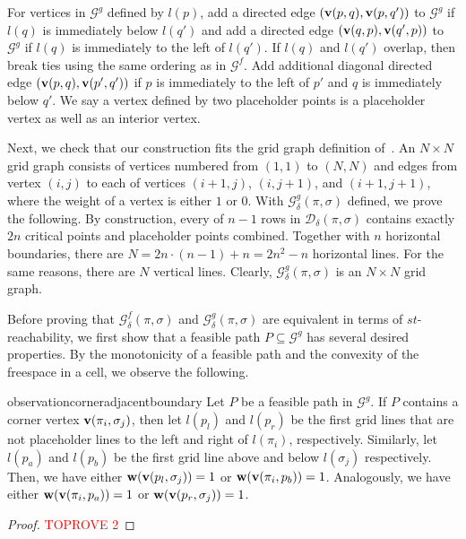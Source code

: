 \documentclass[thm-restate]{lipics-v2021}
\theoremstyle{remark}
\newcommand{\weight}[1]{\normalfont \textbf{w}(#1)}
\newcommand{\graph}[0]{\mathcal{G}}
\newcommand{\fd}[2]{\mathcal{D}_{#2}(#1)}
\newcommand{\vertex}[1]{\normalfont \textbf{v}(#1)}
\newcommand{\fsgraph}[0]{\graph^{f}}
\newcommand{\ggraph}[0]{\graph^g}
\begin{document}
For vertices in $\ggraph$ defined by $l(p)$, add a directed edge $(\vertex{p, q}, \vertex{p, q'})$ to $\ggraph$ if $l(q)$ is immediately below $l(q')$ and add a directed edge $(\vertex{q, p}, \vertex{q', p})$ to $\ggraph$ if $l(q)$ is immediately to the left of $l(q')$. If $l(q)$ and $l(q')$ overlap, then break ties using the same ordering as in $\fsgraph$. Add additional diagonal directed edge $(\vertex{p, q}, \vertex{p', q'})$ if $p$ is immediately to the left of $p'$ and $q$ is immediately below $q'$. We say a vertex defined by two placeholder points is a placeholder vertex as well as an interior vertex. 

Next, we check that our construction fits the grid graph definition of~\cite{bringmannFrechetDistanceTranslation2021}. An $N \times N$ grid graph consists of vertices numbered from $(1, 1)$ to $(N, N)$ and edges from vertex $(i, j)$ to each of vertices $(i + 1, j)$, $(i, j + 1)$, and $(i + 1, j + 1)$, where the weight of a vertex is either $1$ or $0$. With $\ggraph_{\delta}(\pi, \sigma)$ defined, we prove the following. By construction, every of $n - 1$ rows in $\fd{\pi, \sigma}{\delta}$ contains exactly $2n$ critical points and placeholder points combined. Together with $n$ horizontal boundaries, there are $N = 2n \cdot (n - 1) + n = 2n^2 - n$ horizontal lines. For the same reasons, there are $N$ vertical lines. Clearly, $\ggraph_{\delta}(\pi, \sigma)$ is an $N \times N$ grid graph. 

Before proving that $\fsgraph_\delta(\pi, \sigma)$ and $\ggraph_\delta(\pi, \sigma)$ are equivalent in terms of $st$-reachability, we first show that a feasible path $P \subseteq \ggraph$ has several desired properties. By the monotonicity of a feasible path and the convexity of the freespace in a cell, we observe the following. 
\begin{restatable}{observation}{corneradjacentboundary} \label{obs:corner-adjacent-to-boundary-1}
    Let $P$ be a feasible path in $\ggraph$. If $P$ contains a corner vertex $\vertex{\pi_i, \sigma_j}$, then let $l(p_l)$ and $l(p_r)$ be the first grid lines that are not placeholder lines to the left and right of $l(\pi_i)$, respectively. Similarly, let $l(p_a)$ and $l(p_b)$ be the first grid line above and below $l(\sigma_j)$ respectively. Then, we have either $\weight{\vertex{p_l, \sigma_j}} = 1$ or $\weight{\vertex{\pi_i, p_b}} = 1$. Analogously, we have either $\weight{\vertex{\pi_i, p_a}} = 1$ or $\weight{\vertex{p_r, \sigma_j}} = 1$. 
\end{restatable}
\begin{proof}\textcolor{red}{TOPROVE 2}\end{proof}
\end{document}
